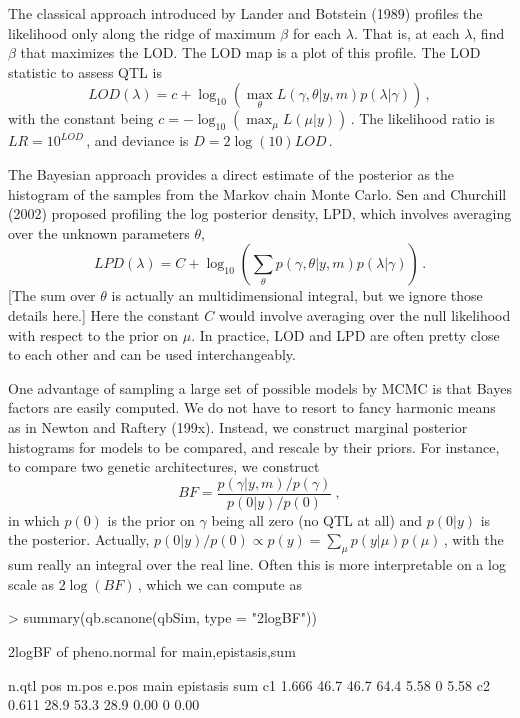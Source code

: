 \documentclass[12pt]{article}
\begin{document}
The classical approach introduced by Lander and Botstein (1989)
profiles the likelihood only along the ridge 
of maximum $\beta$ for each $\lambda$. That is, at each $\lambda$,
find $\beta$ that maximizes the LOD. The LOD map is a plot of this
profile. The LOD statistic to assess QTL is
$$
LOD(\lambda) = c + \log_{10}
\left(
\max_{\theta} L(\gamma,\theta\vert y,m)p(\lambda\vert\gamma)
\right)\,,
$$
with the constant being $c=-\log_{10}(\max_{\mu} L(\mu\vert y))$\,.
The likelihood ratio is $LR=10^{LOD}$\,, and deviance is 
$D=2\log(10)LOD$\,.


The Bayesian approach provides a direct estimate of the posterior as
the histogram of the samples from the Markov chain Monte Carlo. Sen
and Churchill (2002) proposed profiling the log posterior 
density, LPD, which involves averaging over the unknown parameters
$\theta$,
$$
LPD(\lambda) = C + \log_{10}
\left(
\sum_{\theta} p(\gamma, \theta\vert y,m )p(\lambda\vert\gamma)
\right)\,.
$$
[The sum over $\theta$ is actually an multidimensional integral, but
we ignore those details here.]
Here the constant $C$ would involve averaging over the null likelihood
with respect to the prior on $\mu$. In practice, LOD and LPD are often
pretty close to each other and can be used interchangeably.

One advantage of sampling a large set of possible models by MCMC is
that Bayes factors are easily computed. We do not have to resort to
fancy harmonic means as in Newton and Raftery (199x). Instead, we
construct marginal posterior histograms for models to be compared, and
rescale by their priors. For instance, to compare two genetic
architectures, we construct
$$
BF = \frac{\displaystyle p(\gamma\vert y,m)/p(\gamma)}
{\displaystyle p(0\vert y)/p(0)}~,
$$
in which $p(0)$ is the prior on $\gamma$ being all zero (no QTL at
all) and $p(0\vert y)$ is the posterior. Actually,
$p(0\vert y)/p(0)\propto p(y)=\sum_{\mu}p(y\vert\mu)p(\mu)$\,,
with the sum really an integral over the real line.
Often this is more interpretable on a log scale as $2\log(BF)$\,,
which we can compute as

\begin{Schunk}
\begin{Sinput}
> summary(qb.scanone(qbSim, type = "2logBF"))
\end{Sinput}
\begin{Soutput}
2logBF of pheno.normal for main,epistasis,sum 

   n.qtl  pos m.pos e.pos main epistasis  sum
c1 1.666 46.7  46.7  64.4 5.58         0 5.58
c2 0.611 28.9  53.3  28.9 0.00         0 0.00
\end{Soutput}
\end{Schunk}
\end{document}
